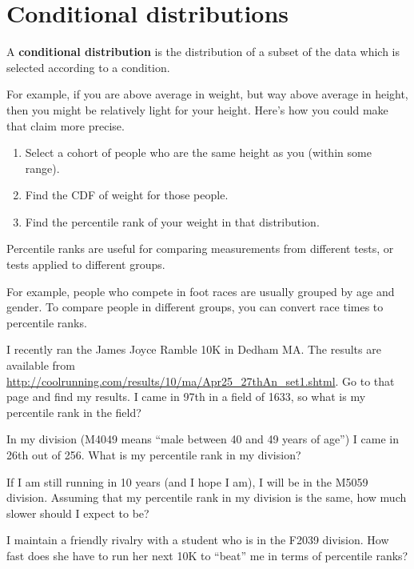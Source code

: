 \documentclass[12pt]{book}
\begin{document}
\section{Conditional distributions}

A {\bf conditional distribution} is the distribution of a subset of
the data which is selected according to a condition.

For example, if you are above average in weight, but way above average
in height, then you might be relatively light for your height.  Here's
how you could make that claim more precise.

\begin{enumerate}

\item Select a cohort of people who are the same height as you (within
some range).

\item Find the CDF of weight for those people.

\item Find the percentile rank of your weight in that distribution.

\end{enumerate}

Percentile ranks are useful for comparing measurements from
different tests, or tests applied to different groups.

For example, people who compete in foot races are usually grouped by
age and gender.  To compare people in different groups, you can convert
race times to percentile ranks.

\begin{exercise}
I recently ran the James Joyce Ramble 10K
in Dedham MA.  The results are available from
\url{http://coolrunning.com/results/10/ma/Apr25_27thAn_set1.shtml}.
Go to that page and find my results.  I came in 97th in a field
of 1633, so what is my percentile rank in the field?

In my division (M4049 means ``male between 40 and 49 years of age'')
I came in 26th out of 256.  What is my percentile rank in my division?

If I am still running in 10 years (and I hope I am), I will be in
the M5059 division.  Assuming that my percentile rank in my division
is the same, how much slower should I expect to be?

I maintain a friendly rivalry with a student who is in the
F2039 division.  How fast does she have to run her next 10K to
``beat'' me in terms of percentile ranks?

\end{exercise}
\end{document}

